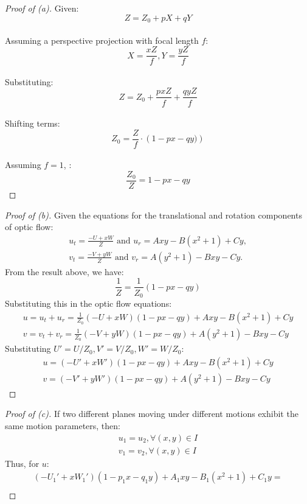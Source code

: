 \documentclass[letter,11pt]{article}
\begin{document}
{	{\begin{proof}[Proof of (a)]
Given:
$$Z=Z_0 + pX + qY$$\\
Assuming a perspective projection with focal length $f$: \\
$$X=\frac{xZ}{f},Y=\frac{yZ}{f}$$\\
Substituting:\\
$$Z = Z_0 + \frac{pxZ}{f}+\frac{qyZ}{f}$$\\
Shifting terms:\\
$$Z_0 = \frac{Z}{f} \cdot \left(1 - px - qy)\right)$$\\
Assuming $f=1$, :\\
$$\frac{Z_0}{Z}=1-px-qy$$
\end{proof}}
\begin{proof}[Proof of (b)]
	Given the equations for the translational and rotation components of optic flow\cite{robotvision}:
\begin{eqnarray*}
	u_t = \frac{-U+xW}{Z} \textrm{ and } u_r = Axy - B(x^2+1) + Cy,\\
	v_t = \frac{-V+yW}{Z} \textrm{ and } v_r = A(y^2+1) - Bxy - Cy.
\end{eqnarray*}
From the result above, we have:
\begin{equation}
	\frac{1}{Z} = \frac{1}{Z_0}(1-px-qy)
\end{equation}
Substituting this in the optic flow equations:
\begin{eqnarray*}
	u = u_t + u_r = \frac{1}{Z_0}(-U+xW)(1-px-qy) + Axy - B(x^2+1) + Cy\\
	v = v_t + v_r = \frac{1}{Z_0}(-V+yW)(1-px-qy) + A(y^2+1) - Bxy - Cy
\end{eqnarray*}
Substituting $U'=U/Z_0,V'=V/Z_0,W'=W/Z_0$:
\begin{eqnarray*}
    u = (-U'+xW')(1-px-qy) + Axy - B(x^2+1) + Cy\\
    v = (-V'+yW')(1-px-qy) + A(y^2+1) - Bxy - Cy
\end{eqnarray*}
\end{proof}
\begin{proof}[Proof of (c)]
If two different planes moving under different motions exhibit the same motion parameters, then:
\begin{eqnarray*}
	    u_1 = u_2, \forall (x,y) \in I \\
		v_1 = v_2, \forall (x,y) \in I
\end{eqnarray*}
Thus, for $u$:
\begin{equation*}
	\begin{split}
	(-U_1'+xW_1')(1-p_1x-q_1y) + A_1xy - B_1(x^2+1) + C_1y = \\

\end{split}
\end{equation*}
\end{proof}}
\end{document}
